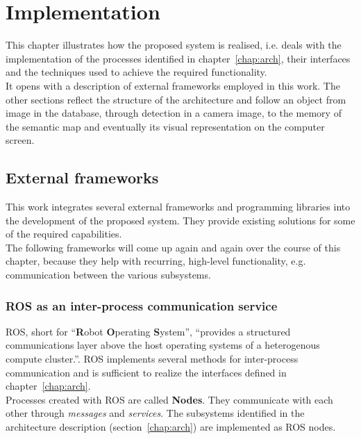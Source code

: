 \chapter{Implementation}
\label{chap:impl}
This chapter illustrates how the proposed system is realised, i.e. deals with the implementation of the processes identified in chapter~\ref{chap:arch}, their interfaces and the techniques used to achieve the required functionality. \\

It opens with a description of external frameworks employed in this work. The other sections reflect the structure of the architecture and follow an object from image in the database, through detection in a camera image, to the memory of the semantic map and eventually its visual representation on the computer screen.


\section{External frameworks}
\label{sec:impl-external}
This work integrates several external frameworks and programming libraries into the development of the proposed system. They provide existing solutions for some of the required capabilities. \\

The following frameworks will come up again and again over the course of this chapter, because they help with recurring, high-level functionality, e.g. communication between the various subsystems.

\subsection{ROS as an inter-process communication service}
\label{sec:impl-ros}
ROS, short for ``\textbf{R}obot \textbf{O}perating \textbf{S}ystem'', ``provides a structured communications layer above
the host operating systems of a heterogenous compute cluster.''\cite{quigley2009ros}. ROS implements several methods for inter-process communication and is sufficient to realize the interfaces defined in chapter~\ref{chap:arch}. \\

Processes created with ROS are called \textbf{Nodes}. They communicate with each other through \textit{messages} and \textit{services}. The subsystems identified in the architecture description (section~\ref{chap:arch}) are implemented as ROS nodes. \\

